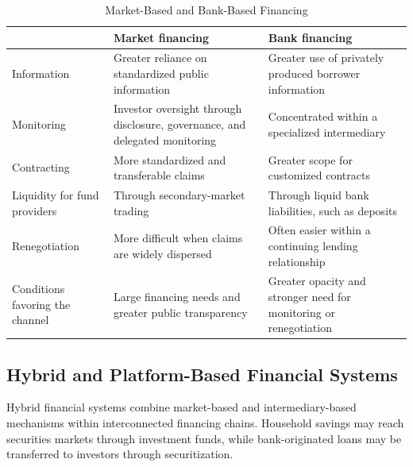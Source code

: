 \begin{table}[htbp]
\centering
\caption{Market-Based and Bank-Based Financing}
\label{tab:ch4-market-bank}

\renewcommand{\arraystretch}{1.15}

\begin{tabularx}{\textwidth}{
@{}
>{\raggedright\arraybackslash}p{3.0cm}
>{\raggedright\arraybackslash}X
>{\raggedright\arraybackslash}X
@{}
}

\toprule
& \textbf{Market financing}
& \textbf{Bank financing} \\
\midrule

Information
& Greater reliance on standardized public information
& Greater use of privately produced borrower information \\

Monitoring
& Investor oversight through disclosure, governance, and delegated monitoring
& Concentrated within a specialized intermediary \\

Contracting
& More standardized and transferable claims
& Greater scope for customized contracts \\

Liquidity for fund providers
& Through secondary-market trading
& Through liquid bank liabilities, such as deposits \\

Renegotiation
& More difficult when claims are widely dispersed
& Often easier within a continuing lending relationship \\

Conditions favoring the channel
& Large financing needs and greater public transparency
& Greater opacity and stronger need for monitoring or renegotiation \\

\bottomrule
\end{tabularx}
\end{table}

\subsection{Hybrid and Platform-Based Financial Systems}

Hybrid financial systems combine market-based and intermediary-based mechanisms within interconnected financing chains. Household savings may reach securities markets through investment funds, while bank-originated loans may be transferred to investors through securitization.

